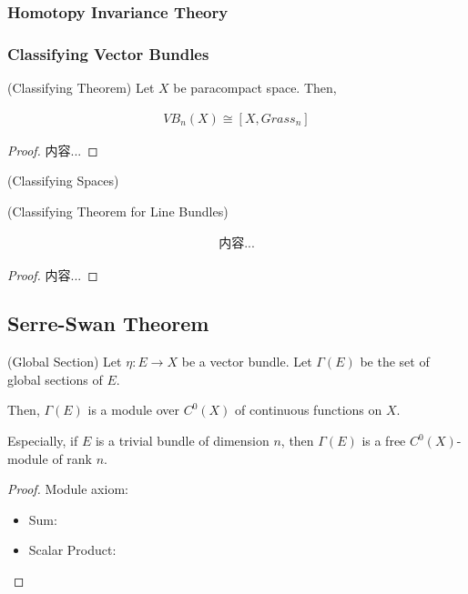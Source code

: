 \documentclass[Total.tex]{subfiles}
\begin{document}
	\subsubsection{Homotopy Invariance Theory}
	
	\subsubsection{Classifying Vector Bundles}
	
	\begin{theorem}
		(Classifying Theorem) Let $X$ be paracompact space. Then, 
		
		\begin{gather*}
			VB_n(X)\cong [X,Grass_n]
		\end{gather*}
	\end{theorem}
	
	\begin{proof}
		内容...
	\end{proof}
	
	\begin{Def}
		(Classifying Spaces)
	\end{Def}
	
	\begin{theorem}
		(Classifying Theorem for Line Bundles) 
		
		\begin{gather*}
			内容...
		\end{gather*}
	\end{theorem}
	
	\begin{proof}
		内容...
	\end{proof}
	
	\subsection{Serre-Swan Theorem}
	
	\begin{proposition}
		(Global Section) Let $\eta:E\rightarrow X$ be a vector bundle. Let $\Gamma(E)$ be the set of global sections of $E$. 
		
		Then, $\Gamma(E)$ is a module over $C^0(X)$ of continuous functions on $X$. 
		
		Especially, if $E$ is a trivial bundle of dimension $n$, then $\Gamma(E)$ is a free $C^0(X)$-module of rank $n$.
	\end{proposition}
	
	\begin{proof}
		Module axiom:
		\begin{itemize}
			\item Sum:
			\item Scalar Product:
		\end{itemize}
	\end{proof}
	
\end{document}
